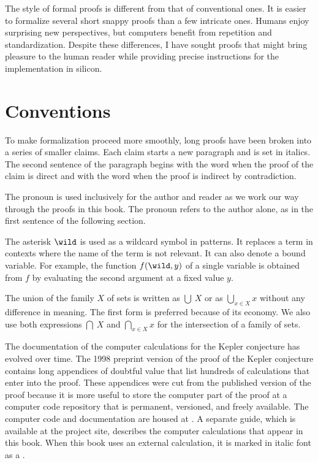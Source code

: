 The style of formal proofs is different from that of conventional
ones.  It is easier to formalize several short snappy proofs
than a few intricate ones.  Humans enjoy surprising new perspectives,
but computers benefit from repetition and standardization.  Despite
these differences, I have sought  proofs that might bring
pleasure to the human reader while providing precise instructions for
the implementation in silicon.

\section*{Conventions}

To make formalization proceed more smoothly, long proofs have been
broken into a series of smaller claims.  Each claim starts a new paragraph
and is set in italics.  The second sentence of the paragraph begins with
the word  when the proof of the claim is direct and with
the word  when the proof is indirect by contradiction.

The pronoun  is used inclusively for the author and reader as
we work our way through the proofs in this book.  The pronoun  
refers to the author alone, as in the first sentence of the following section.

The asterisk $\wild$ is used as a wildcard symbol in patterns.  It
replaces a term in contexts where the name of the term is not
relevant.  It can also denote a bound variable.  For example, the
function $f(\wild,y)$ of a single variable is obtained from $f$ by
evaluating the second argument at a fixed value $y$.

The union of the family $X$ of sets is written as $\bigcup\ X$ or as
$\bigcup_{x\in X} x$ without any difference in meaning.  The first form
is preferred because of its economy.  We also use both expressions
$\bigcap\ X$ and $\bigcap_{x\in X} x$ for the intersection of a family of sets.

The documentation of the computer calculations for the Kepler
conjecture has evolved over time.  The 1998 preprint version of the
proof of the Kepler conjecture contains long appendices of doubtful
value that list hundreds of calculations that enter into the proof.
These appendices were cut from the published version of the proof
because it is more useful to store the computer part of the proof at a
computer code repository that is permanent, versioned, and freely
available.  The computer code and documentation are housed at
.  A separate guide, which is
available at the project site, describes the computer calculations
that appear in this book.  When this book uses an external
calculation, it is marked in italic font as a .

